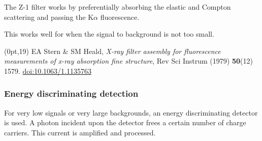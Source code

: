 \documentclass[10pt, xcolor=x11names, compress]{beamer}
\begin{document}
\begin{frame}
  The Z-1 filter works by preferentially absorbing the elastic and
  Compton scattering and passing the K$\alpha$ fluorescence.

  \medskip

  This works well for when the signal to background is not too small.

  \begin{textblock*}{0.5\linewidth}(0pt,19\TPVertModule)%
    \tiny
    EA Stern \& SM Heald, \textit{X-ray filter assembly for
      fluorescence measurements of x-ray absorption fine structure}, 
    Rev Sci Instrum (1979) \textbf{50}(12) 1579.
    \href{http://dx.doi.org/10.1063/1.1135763}
    {\color{Purple3}doi:10.1063/1.1135763}
  \end{textblock*}
\end{frame}

\begin{frame}
  \frametitle{Energy discriminating detection}
  
  For very low signals or very large backgrounds, an energy
  discriminating detector is used.  A photon incident upon the
  detector frees a certain number of charge carriers.  This current is
  amplified and processed.

  \medskip


\end{frame}
\end{document}
